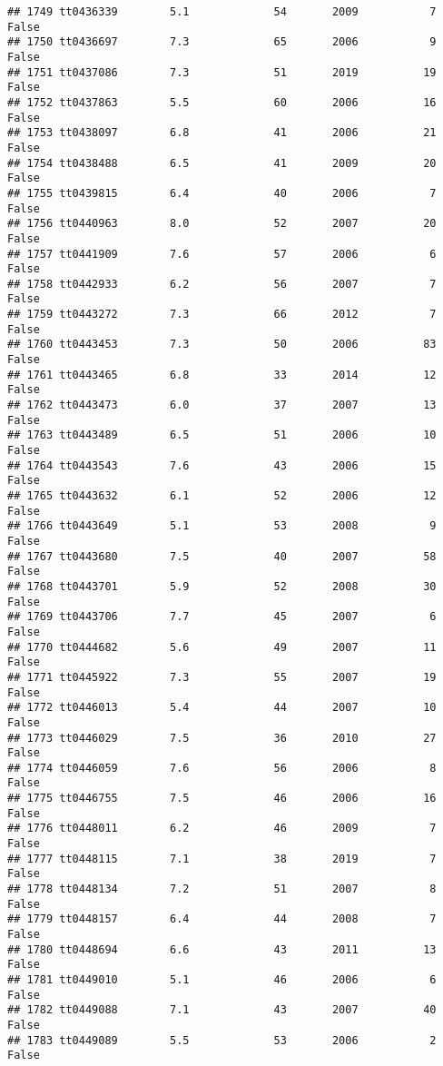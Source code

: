 \documentclass[
]{article}
\begin{document}
\begin{verbatim}
## 1749 tt0436339        5.1             54       2009           7   False
## 1750 tt0436697        7.3             65       2006           9   False
## 1751 tt0437086        7.3             51       2019          19   False
## 1752 tt0437863        5.5             60       2006          16   False
## 1753 tt0438097        6.8             41       2006          21   False
## 1754 tt0438488        6.5             41       2009          20   False
## 1755 tt0439815        6.4             40       2006           7   False
## 1756 tt0440963        8.0             52       2007          20   False
## 1757 tt0441909        7.6             57       2006           6   False
## 1758 tt0442933        6.2             56       2007           7   False
## 1759 tt0443272        7.3             66       2012           7   False
## 1760 tt0443453        7.3             50       2006          83   False
## 1761 tt0443465        6.8             33       2014          12   False
## 1762 tt0443473        6.0             37       2007          13   False
## 1763 tt0443489        6.5             51       2006          10   False
## 1764 tt0443543        7.6             43       2006          15   False
## 1765 tt0443632        6.1             52       2006          12   False
## 1766 tt0443649        5.1             53       2008           9   False
## 1767 tt0443680        7.5             40       2007          58   False
## 1768 tt0443701        5.9             52       2008          30   False
## 1769 tt0443706        7.7             45       2007           6   False
## 1770 tt0444682        5.6             49       2007          11   False
## 1771 tt0445922        7.3             55       2007          19   False
## 1772 tt0446013        5.4             44       2007          10   False
## 1773 tt0446029        7.5             36       2010          27   False
## 1774 tt0446059        7.6             56       2006           8   False
## 1775 tt0446755        7.5             46       2006          16   False
## 1776 tt0448011        6.2             46       2009           7   False
## 1777 tt0448115        7.1             38       2019           7   False
## 1778 tt0448134        7.2             51       2007           8   False
## 1779 tt0448157        6.4             44       2008           7   False
## 1780 tt0448694        6.6             43       2011          13   False
## 1781 tt0449010        5.1             46       2006           6   False
## 1782 tt0449088        7.1             43       2007          40   False
## 1783 tt0449089        5.5             53       2006           2   False

\end{verbatim}
\end{document}
